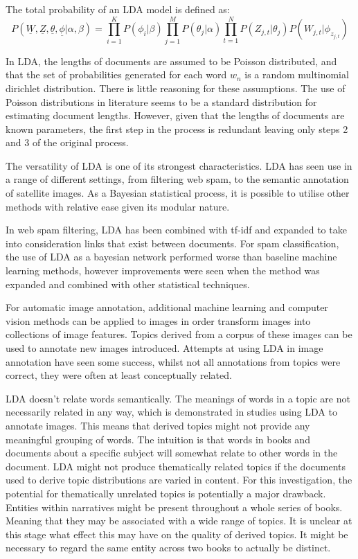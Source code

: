 \documentclass[10pt]{report}
\begin{document}
\renewcommand{\baselinestretch}{1.0}\normalsize
The total probability of an LDA model is defined as:
\[
  P(\underline{W},\underline{Z},\underline{\theta},\underline{\phi}|\alpha,\beta) = \prod^{K}_{i=1} P(\phi_i|\beta) \prod^{M}_{j=1} P(\theta_j|\alpha)\prod^{N}_{t=1} P(Z_{j,t} | \theta_j)P(W_{j,t} | \phi_{z_{j,t}})
\]
\renewcommand{\baselinestretch}{2.0}\normalsize

In LDA, the lengths of documents are assumed to be Poisson distributed, and that the set of probabilities  generated for each word \(w_n\) is a random multinomial dirichlet distribution. There is little reasoning for these assumptions. The use of Poisson distributions in literature seems to be a standard distribution for estimating document lengths. However, given that the lengths of documents are known parameters, the first step in the process is redundant leaving only steps 2 and 3 of the original process.

The versatility of LDA is one of its strongest characteristics. LDA has seen use in a range of different settings, from filtering web spam, to the semantic annotation of satellite images. As a Bayesian statistical process, it is possible to utilise other methods with relative ease given its modular nature.

In web spam filtering, LDA has been combined with tf-idf and expanded to take into consideration links that exist between documents. For spam classification, the use of LDA as a bayesian network performed worse than baseline machine learning methods, however improvements were seen when the method was expanded and combined with other statistical techniques.~\cite{Biro2008-ld}

For automatic image annotation, additional machine learning and computer vision methods can be applied to images in order transform images into collections of image features. Topics derived from a corpus of these images can be used to annotate new images introduced. Attempts at using LDA in image annotation have seen some success, whilst not all annotations from topics were correct, they were often at least conceptually related.~\cite{Feng2010-dp, Zhang2011-dn}

LDA doesn’t relate words semantically. The meanings of words in a topic are not necessarily related in any way, which is demonstrated in studies using LDA to annotate images. This means that derived topics might not provide any meaningful grouping of words. The intuition is that words in books and documents about a specific subject will somewhat relate to other words in the document. LDA might not produce thematically related topics if the documents used to derive topic distributions are varied in content. For this investigation, the potential for thematically unrelated topics is potentially a major drawback. Entities within narratives might be present throughout a whole series of books. Meaning that they may be associated with a wide range of topics. It is unclear at this stage what effect this may have on the quality of derived topics. It might be necessary to regard the same entity across two books to actually be distinct.
\end{document}
